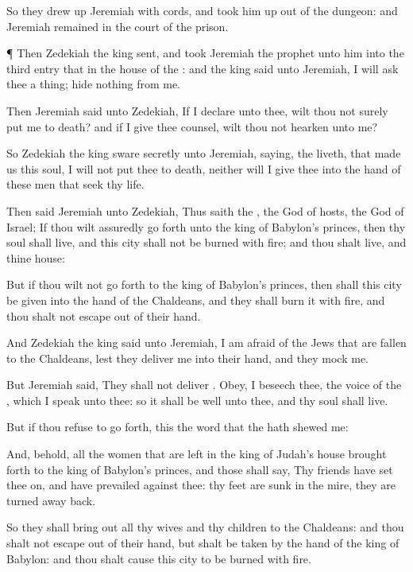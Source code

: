 {So they drew
up
Jeremiah with
cords, and took him
up out of the
dungeon: and
Jeremiah
remained in the
court of the
prison.


\par }{\PP {}¶ Then
Zedekiah the
king
sent, and
took
Jeremiah the
prophet unto him into the
third
entry that
{} in the
house of the
{}: and the
king
said unto
Jeremiah, I will
ask thee a
thing;
hide nothing from me.

Then
Jeremiah
said unto
Zedekiah, If I
declare
{} unto thee, wilt thou not
surely put me to
death? and if I give thee
counsel, wilt thou not
hearken unto me?

So
Zedekiah the
king
sware
secretly unto
Jeremiah,
saying,
{} the
{}
liveth, that
made us this
soul, I will not put thee to
death, neither will I
give thee into the
hand of these
men that
seek thy
life.

Then
said
Jeremiah unto
Zedekiah, Thus
saith the
{}, the
God of
hosts, the
God of
Israel; If thou wilt
assuredly go
forth unto the
king of
Babylon’s
princes, then thy
soul shall
live, and this
city shall not be
burned with
fire; and thou shalt
live, and thine
house:

But if thou wilt not go
forth to the
king of
Babylon’s
princes, then shall this
city be
given into the
hand of the
Chaldeans, and they shall
burn it with
fire, and thou shalt not escape
out of their
hand.

And
Zedekiah the
king
said unto
Jeremiah, I am
afraid of the
Jews that are
fallen to the
Chaldeans, lest they
deliver me into their
hand, and they
mock me.

But
Jeremiah
said, They shall not
deliver
{}.
Obey, I beseech thee, the
voice of the
{}, which I
speak unto thee: so it shall be
well unto thee, and thy
soul shall
live.

But if thou
refuse to go
forth, this
{} the
word that the
{} hath
shewed me:

And, behold, all the
women that are
left in the
king of
Judah’s
house
{} brought
forth to the
king of
Babylon’s
princes, and those
{} shall
say, Thy
friends have set thee
on, and have
prevailed against thee: thy
feet are
sunk in the
mire,
{} they are turned
away
back.

So they shall bring
out all thy
wives and thy
children to the
Chaldeans: and thou shalt not escape
out of their
hand, but shalt be
taken by the
hand of the
king of
Babylon: and thou shalt cause this
city to be
burned with
fire.


}

